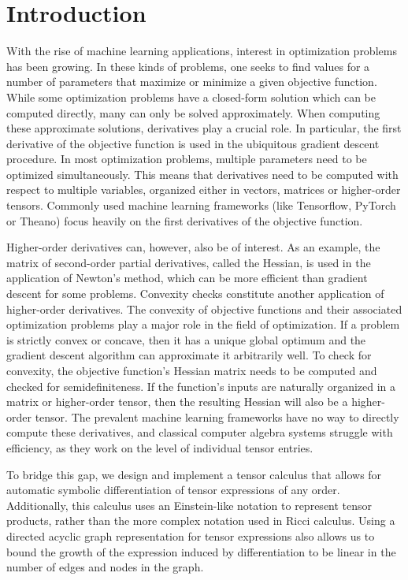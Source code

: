 \documentclass[12pt, a4paper]{report}
\begin{document}
\chapter{Introduction}

With the rise of machine learning applications, interest in optimization problems has been growing.
In these kinds of problems, one seeks to find values for a number of parameters that maximize or minimize a given objective function.
While some optimization problems have a closed-form solution which can be computed directly, many can only be solved approximately.
When computing these approximate solutions, derivatives play a crucial role.
In particular, the first derivative of the objective function is used in the ubiquitous gradient descent procedure.
In most optimization problems, multiple parameters need to be optimized simultaneously.
This means that derivatives need to be computed with respect to multiple variables, organized either in vectors, matrices or higher-order tensors.
Commonly used machine learning frameworks (like Tensorflow, PyTorch or Theano) focus heavily on the first derivatives of the objective function.

Higher-order derivatives can, however, also be of interest.
As an example, the matrix of second-order partial derivatives, called the Hessian, is used in the application of Newton's method, which can be more efficient than gradient descent for some problems.
Convexity checks constitute another application of higher-order derivatives.
The convexity of objective functions and their associated optimization problems play a major role in the field of optimization.
If a problem is strictly convex or concave, then it has a unique global optimum and the gradient descent algorithm can approximate it arbitrarily well.
To check for convexity, the objective function's Hessian matrix needs to be computed and checked for semidefiniteness.
If the function's inputs are naturally organized in a matrix or higher-order tensor, then the resulting Hessian will also be a higher-order tensor.
The prevalent machine learning frameworks have no way to directly compute these derivatives, and classical computer algebra systems struggle with efficiency, as they work on the level of individual tensor entries.

To bridge this gap, we design and implement a tensor calculus that allows for automatic symbolic differentiation of tensor expressions of any order.
Additionally, this calculus uses an Einstein-like notation to represent tensor products, rather than the more complex notation used in Ricci calculus.
Using a directed acyclic graph representation for tensor expressions also allows us to bound the growth of the expression induced by differentiation to be linear in the number of edges and nodes in the graph.
\end{document}
